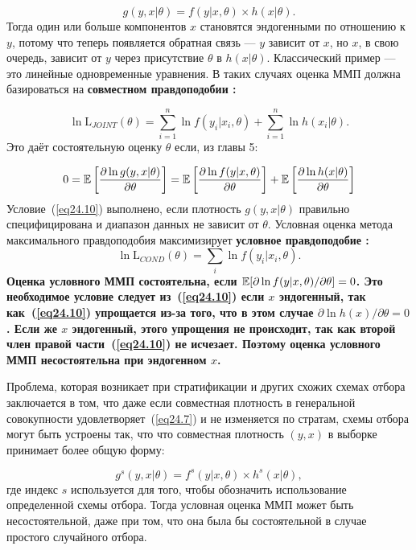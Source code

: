 \begin{equation}
\label{eq24.8}
g(y, x|\theta) = f (y| x, \theta) \times h(x|\theta). 
\end{equation}
Тогда один или больше компонентов $x$ становятся эндогенными по отношению к $y$, потому что теперь появляется обратная связь --- $y$ зависит от $x$, но $x$, в свою очередь, зависит от $y$ через присутствие $\theta$ в $h(x|\theta)$. Классический пример --- это линейные одновременные уравнения. В таких случаях оценка ММП должна базироваться на \bfseries совместном правдоподобии \mdseries: 

\begin{equation}
\label{eq24.9}
\ln \mathrm{L}_{JOINT}(\theta) = \sum_{i=1}^n \ln{f(y_i|x_i, \theta)} + \sum_{i=1}^n \ln h(x_i|\theta). 
\end{equation}
Это даёт состоятельную оценку $\theta$ если, из главы 5:

\begin{equation}
\label{eq24.10}
0 = \mathbb{E} \left[\frac{\partial \ln{g(y, x|\theta)}}{\partial \theta} \right] = \mathbb{E} \left[\frac{\partial \ln{f(y | x,\theta)}}{\partial \theta} \right] + \mathbb{E} \left[ \frac{\partial \ln{h(x|\theta)}}{\partial \theta} \right]
\end{equation}
Условие~(\ref{eq24.10}) выполнено, если плотность $g(y, x|\theta)$ правильно специфицирована и диапазон данных не зависит от $\theta$. Условная оценка метода максимального правдоподобия максимизирует \bfseries условное правдоподобие \mdseries : 
$$
\ln \mathrm{L}_{COND}(\theta) = \sum_{i}\ln f(y_i|x_i, \theta).
$$
Оценка условного ММП состоятельна, если $\mathbb{E}[ \partial \ln f(y|x,\theta) / \partial \theta] = 0$. Это необходимое условие следует из~(\ref{eq24.10}) если $x$ эндогенный, так как~(\ref{eq24.10}) упрощается из-за того, что в этом случае $\partial \ln h(x) / \partial \theta = 0$. Если же $x$ эндогенный, этого упрощения не происходит, так как второй член правой части~(\ref{eq24.10}) не исчезает. Поэтому оценка условного ММП несостоятельна при эндогенном $x$. 

Проблема, которая возникает при стратификации и других схожих схемах отбора заключается в том, что даже если совместная плотность в генеральной совокупности удовлетворяет~(\ref{eq24.7}) и не изменяется по стратам, схемы отбора могут быть устроены так, что что совместная плотность $(y,x)$ в выборке принимает более общую форму:

\begin{equation}
\label{eq24.11}
g^s(y,x|\theta) = f^s(y|x,\theta) \times h^s(x|\theta),
\end{equation}
где индекс $s$ используется для того, чтобы обозначить использование определенной схемы отбора. Тогда условная оценка ММП может быть несостоятельной, даже при том, что она была бы состоятельной в случае простого случайного отбора. 

